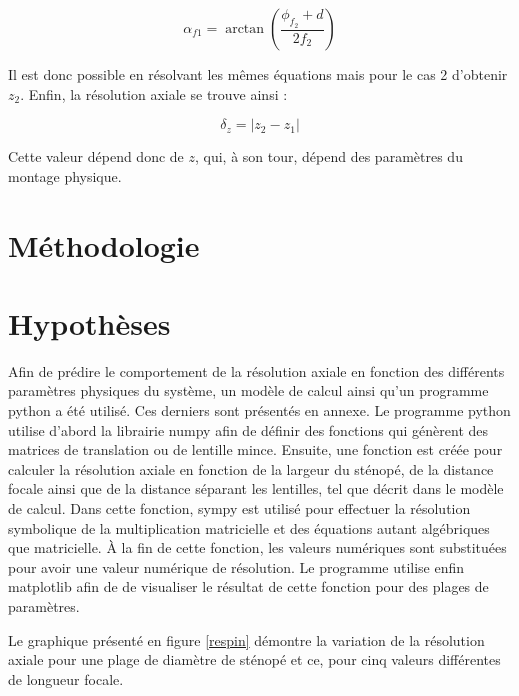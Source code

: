 \documentclass[11pt,letterpaper]{article}
\begin{document}
\begin{equation}
  \alpha_{f1}= \arctan\left( \frac{\phi_{f_{2}}+d}{2f_{2}} \right)
\end{equation}

Il est donc possible en résolvant les mêmes équations mais pour le cas 2 d'obtenir $z_{2}$. Enfin, la résolution axiale se trouve ainsi :

\begin{equation}
  \delta_{z}= |z_{2}-z_{1}|
\end{equation}

Cette valeur dépend donc de $z$, qui, à son tour, dépend des paramètres du montage physique.


\section{Méthodologie}

\section{Hypothèses}

Afin de prédire le comportement de la résolution axiale en fonction des différents paramètres physiques du système, un modèle de calcul ainsi qu'un programme python a été utilisé. Ces derniers sont présentés en annexe. Le programme python utilise d'abord la librairie numpy afin de définir des fonctions qui génèrent des matrices de translation ou de lentille mince. Ensuite, une fonction est créée pour calculer la résolution axiale en fonction de la largeur du sténopé, de la distance focale ainsi que de la distance séparant les lentilles, tel que décrit dans le modèle de calcul. Dans cette fonction, sympy est utilisé pour effectuer la résolution symbolique de la multiplication matricielle et des équations autant algébriques que matricielle. À la fin de cette fonction, les valeurs numériques sont substituées pour avoir une valeur numérique de résolution. Le programme utilise enfin matplotlib afin de de visualiser le résultat de cette fonction pour des plages de paramètres.

Le graphique présenté en figure \ref{respin} démontre la variation de la résolution axiale pour une plage de diamètre de sténopé et ce, pour cinq valeurs différentes de longueur focale.
\end{document}
